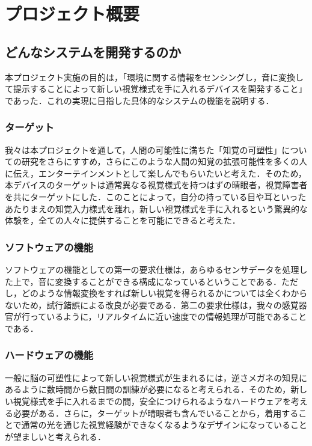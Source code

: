 \section{プロジェクト概要}
\subsection{どんなシステムを開発するのか}
本プロジェクト実施の目的は，「環境に関する情報をセンシングし，音に変換して提示することによって新しい視覚様式を手に入れるデバイスを開発すること」であった．これの実現に目指した具体的なシステムの機能を説明する．
\subsubsection{ターゲット}
我々は本プロジェクトを通して，人間の可能性に満ちた「知覚の可塑性」についての研究をさらにすすめ，さらにこのような人間の知覚の拡張可能性を多くの人に伝え，エンターテインメントとして楽しんでもらいたいと考えた．そのため，本デバイスのターゲットは通常異なる視覚様式を持つはずの晴眼者，視覚障害者を共にターゲットにした．このことによって，自分の持っている目や耳といったあたりまえの知覚入力様式を離れ，新しい視覚様式を手に入れるという驚異的な体験を，全ての人々に提供することを可能にできると考えた．
\subsubsection{ソフトウェアの機能}
ソフトウェアの機能としての第一の要求仕様は，あらゆるセンサデータを処理した上で，音に変換することができる構成になっているということである．ただし，どのような情報変換をすれば新しい視覚を得られるかについては全くわからないため，試行錯誤による改良が必要である．第二の要求仕様は，我々の感覚器官が行っているように，リアルタイムに近い速度での情報処理が可能であることである．
\subsubsection{ハードウェアの機能}
一般に脳の可塑性によって新しい視覚様式が生まれるには，逆さメガネの知見にあるように数時間から数日間の訓練が必要になると考えられる．そのため，新しい視覚様式を手に入れるまでの間，安全につけられるようなハードウェアを考える必要がある．さらに，ターゲットが晴眼者も含んでいることから，着用することで通常の光を通じた視覚経験ができなくなるようなデザインになっていることが望ましいと考えられる．
